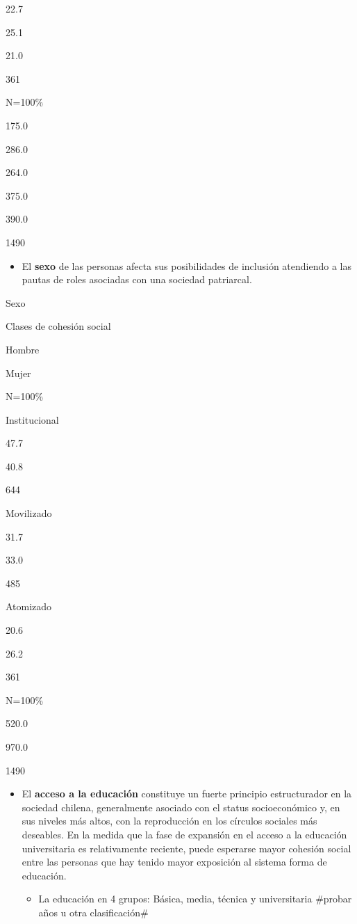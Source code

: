 \documentclass[
  12pt,
]{book}
\providecommand{\tightlist}{%
  \setlength{\itemsep}{0pt}\setlength{\parskip}{0pt}}
\begin{document}
22.7

25.1

21.0

361

N=100\%

175.0

286.0

264.0

375.0

390.0

1490

\begin{itemize}
\tightlist
\item
  El \textbf{sexo} de las personas afecta sus posibilidades de inclusión atendiendo a las pautas de roles asociadas con una sociedad patriarcal.
\end{itemize}

Sexo

Clases de cohesión social

Hombre

Mujer

N=100\%

Institucional

47.7

40.8

644

Movilizado

31.7

33.0

485

Atomizado

20.6

26.2

361

N=100\%

520.0

970.0

1490

\begin{itemize}
\tightlist
\item
  El \textbf{acceso a la educación} constituye un fuerte principio estructurador en la sociedad chilena, generalmente asociado con el status socioeconómico y, en sus niveles más altos, con la reproducción en los círculos sociales más deseables. En la medida que la fase de expansión en el acceso a la educación universitaria es relativamente reciente, puede esperarse mayor cohesión social entre las personas que hay tenido mayor exposición al sistema forma de educación.

  \begin{itemize}
  \tightlist
  \item
    La educación en 4 grupos: Básica, media, técnica y universitaria \#probar años u otra clasificación\#
  \end{itemize}
\end{itemize}
\end{document}
